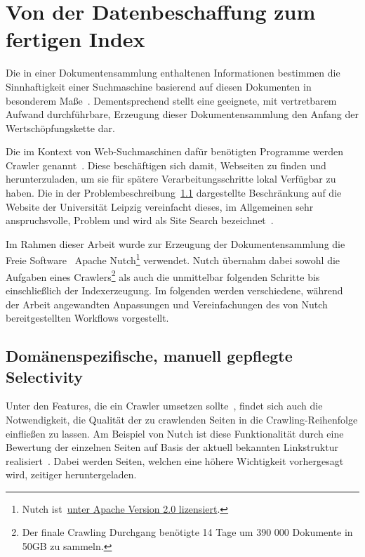 \section{Von der Datenbeschaffung zum fertigen Index}
\label{chap:data_aqcuisition}

Die in einer Dokumentensammlung enthaltenen Informationen bestimmen die Sinnhaftigkeit
einer Suchmaschine basierend auf diesen Dokumenten in besonderem Maße~\cite{croft.chap3}.
Dementsprechend stellt eine geeignete, mit vertretbarem Aufwand durchführbare,
Erzeugung dieser Dokumentensammlung den Anfang der Wertschöpfungskette dar.

Die im Kontext von Web-Suchmaschinen dafür benötigten Programme werden Crawler genannt~\cite{croft.chap3}.
Diese beschäftigen sich damit, Webseiten zu finden und herunterzuladen, um sie für spätere Verarbeitungsschritte lokal Verfügbar zu haben.
Die in der Problembeschreibung~\ref{} dargestellte Beschränkung auf die Website der Universität Leipzig
vereinfacht dieses, im Allgemeinen sehr anspruchsvolle, Problem und wird als Site Search bezeichnet~\cite{croft.chap2}.

Im Rahmen dieser Arbeit wurde zur Erzeugung der Dokumentensammlung die Freie Software~\cite{wiki.free_license}
Apache Nutch\footnote{Nutch ist~\href{https://github.com/apache/nutch/blob/master/LICENSE.txt}{unter Apache Version 2.0 lizensiert}.}
verwendet.
Nutch übernahm dabei sowohl die Aufgaben eines Crawlers\footnote{Der finale Crawling Durchgang benötigte 14 Tage um 390 000 Dokumente in 50GB zu sammeln.}
als auch die unmittelbar folgenden Schritte bis einschließlich der Indexerzeugung.
Im folgenden werden verschiedene, während der Arbeit angewandten Anpassungen und Vereinfachungen des von Nutch bereitgestellten
Workflows vorgestellt.
 
\subsection{Domänenspezifische, manuell gepflegte Selectivity}
Unter den Features, die ein Crawler umsetzen sollte~\cite{manning.chap20},
findet sich auch die Notwendigkeit, die Qualität der zu crawlenden Seiten
in die Crawling-Reihenfolge einfließen zu lassen.
Am Beispiel von Nutch ist diese Funktionalität durch eine Bewertung der einzelnen Seiten
auf Basis der aktuell bekannten Linkstruktur realisiert~\cite{nutch.invert_links}.
Dabei werden Seiten, welchen eine höhere Wichtigkeit vorhergesagt wird, zeitiger heruntergeladen.

